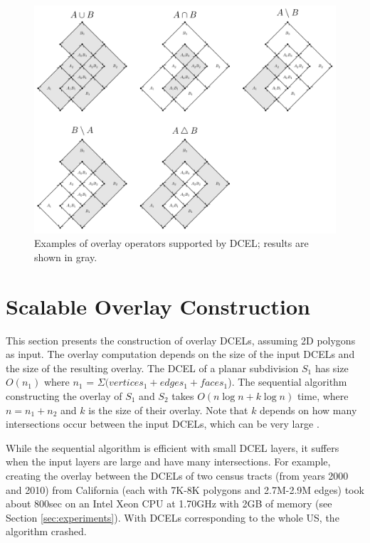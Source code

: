 \begin{figure}
    \centering
    \includegraphics[width=\textwidth]{chapterSDCEL/dcel_operators.pdf}
    \caption{Examples of overlay operators supported by DCEL; results are shown in gray.}
    \label{fig:dcel_operators}
\end{figure}

\section{Scalable Overlay Construction}\label{sec:methods}
This section presents the construction of overlay DCELs, assuming 2D polygons as input. The overlay computation depends on the size of the input DCELs and the size of the resulting overlay. The DCEL of a planar subdivision $S_1$ has size $O(n_1)$ where $n_1$ = $\Sigma (vertices_1 + edges_1 + faces_1$).  The sequential algorithm constructing the overlay of $S_1$ and $S_2$ takes $O(n \log n + k \log n)$ time, where $n = n_1 + n_2$ and $k$ is the size of their overlay.  Note that $k$ depends on how many intersections occur between the input DCELs, which can be very large \cite{berg_computational_2008}.

While the sequential algorithm is efficient with small DCEL layers, it suffers when the input layers are large and have many intersections. For example, creating the overlay between the DCELs of two census tracts (from years 2000 and 2010) from California (each with 7K-8K polygons and 2.7M-2.9M edges) took about 800sec on an Intel Xeon CPU at 1.70GHz  with 2GB of memory (see Section \ref{sec:experiments}). With DCELs corresponding to the whole US, the algorithm crashed.

